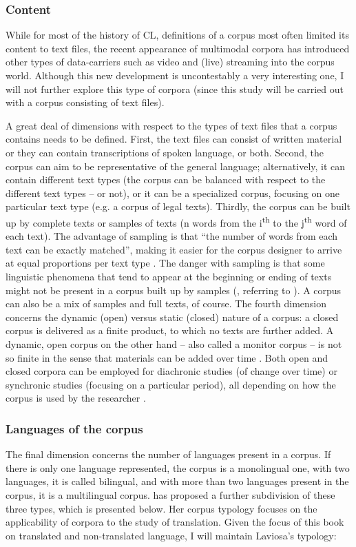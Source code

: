 \subsubsection{Content}
While for most of the history of CL, definitions of a corpus most often limited its content to text files, the recent appearance of multimodal corpora has introduced other types of data-carriers such as video and (live) streaming into the corpus world. Although this new development is uncontestably a very interesting one, I will not further explore this type of corpora (since this study will be carried out with a corpus consisting of text files).

A great deal of dimensions with respect to the types of text files that a corpus contains needs to be defined. First, the text files can consist of written material or they can contain transcriptions of spoken language, or both. Second, the corpus can aim to be representative of the general language; alternatively, it can contain different text types (the corpus can be balanced with respect to the different text types – or not), or it can be a specialized corpus, focusing on one particular text type (e.g. a corpus of legal texts). Thirdly, the corpus can be built up by complete texts or samples of texts (n words from the i\textsuperscript{th} to the j\textsuperscript{th} word of each text). The advantage of sampling is that “the number of words from each text can be exactly matched”, making it easier for the corpus designer to arrive at equal proportions per text type \citep[77]{deignan_metaphor_2005}. The danger with sampling is that some linguistic phenomena that tend to appear at the beginning or ending of texts might not be present in a corpus built up by samples (\citealt[77]{deignan_metaphor_2005}, referring to \citealt{stubbs_text_1996}). A corpus can also be a mix of samples and full texts, of course. The fourth dimension concerns the dynamic (open) versus static (closed) nature of a corpus: a closed corpus is delivered as a finite product, to which no texts are further added. A dynamic, open corpus on the other hand – also called a monitor corpus – is not so finite in the sense that materials can be added over time \citep[6]{mcenery_corpus_2012}. Both open and closed corpora can be employed for diachronic studies (of change over time) or synchronic studies (focusing on a particular period), all depending on how the corpus is used by the researcher \citep[3]{johansson_role_1998}.

\subsubsection{Languages of the corpus}
\label{sec:2.2.1.3}  
The final dimension concerns the number of languages present in a corpus. If there is only one language represented, the corpus is a monolingual one, with two languages, it is called bilingual, and with more than two languages present in the corpus, it is a multilingual corpus. \citet[36--38]{laviosa_corpus-based_2002} has proposed a further subdivision of these three types, which is presented below. Her corpus typology focuses on the applicability of corpora to the study of translation. Given the focus of this book on translated and non-translated language, I will maintain Laviosa’s typology:

